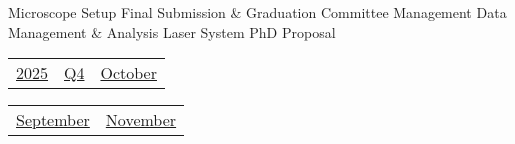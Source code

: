 \vfill{\centering{} \small{Microscope Setup}\hspace{ 1.5em } \small{Final Submission \& Graduation}\hspace{ 1.5em } \small{Committee Management}\hspace{ 1.5em } \small{Data Management \& Analysis}\hspace{ 1.5em } \small{Laser System}\hspace{ 1.5em } \small{PhD Proposal}\hspace{ 1.5em }\par}

\pagebreak
{\noindent\Large\renewcommand{\arraystretch}{\myNumArrayStretch}\begin{tabular}{|l|l|l}
\hyperlink{2025}{2025} & \hyperlink{Q4}{Q4} & \hyperlink{October}{October}
\end{tabular}\hfill%
\begin{tabular}{r|r@{}}
\hyperlink{month-2025-9}{September} & \hyperlink{month-2025-11}{November}
\end{tabular}}
\myLineThick
